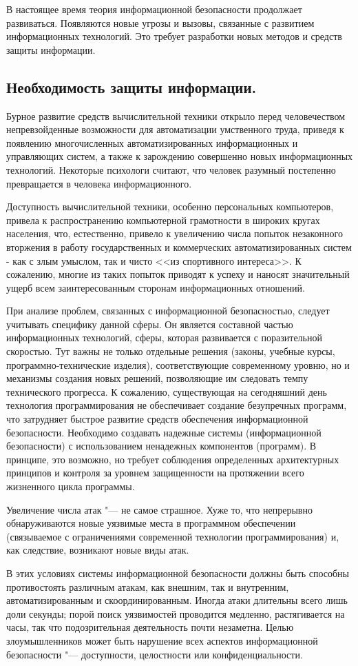 В настоящее время теория информационной безопасности продолжает развиваться. Появляются новые угрозы и вызовы, связанные с 
развитием информационных технологий. Это требует разработки новых методов и средств защиты информации\cite{urfu}.

\newpage
\subsection{Необходимость защиты информации.}
Бурное развитие средств вычислительной техники открыло перед человечеством непревзойденные возможности для автоматизации 
умственного труда, приведя к появлению многочисленных автоматизированных информационных и управляющих систем, а также к 
зарождению совершенно новых информационных технологий. Некоторые психологи считают, что человек разумный постепенно 
превращается в человека информационного.

Доступность вычислительной техники, особенно персональных компьютеров, привела к распространению компьютерной грамотности в 
широких кругах населения, что, естественно, привело к увеличению числа попыток незаконного вторжения в работу государственных 
и коммерческих автоматизированных систем - как с злым умыслом, так и чисто <<из спортивного интереса>>. К сожалению, многие из 
таких попыток приводят к успеху и наносят значительный ущерб всем заинтересованным сторонам информационных отношений.

При анализе проблем, связанных с информационной безопасностью, следует учитывать специфику данной сферы. Он 
является составной частью информационных технологий, сферы, которая развивается с поразительной скоростью. Тут важны не 
только отдельные решения (законы, учебные курсы, программно-технические изделия), соответствующие современному уровню, но и 
механизмы создания новых решений, позволяющие им следовать темпу технического прогресса. К сожалению, существующая на 
сегодняшний день технология программирования не обеспечивает создание безупречных программ, что затрудняет быстрое развитие 
средств обеспечения информационной безопасности. Необходимо создавать надежные системы (информационной безопасности) с 
использованием ненадежных компонентов (программ). В принципе, это возможно, но требует соблюдения определенных архитектурных 
принципов и контроля за уровнем защищенности на протяжении всего жизненного цикла программы.

Увеличение числа атак "--- не самое страшное. Хуже то, что непрерывно обнаруживаются новые уязвимые места в программном 
обеспечении (связываемое с ограничениями современной технологии программирования) и, как следствие, возникают новые виды атак.

В этих условиях системы информационной безопасности должны быть способны противостоять различным атакам, как внешним, так и 
внутренним, автоматизированным и скоординированным. Иногда атаки длительны всего лишь доли секунды; порой поиск уязвимостей 
проводится медленно, растягивается на часы, так что подозрительная деятельность почти незаметна. Целью злоумышленников может 
быть нарушение всех аспектов информационной безопасности "---  доступности, целостности или конфиденциальности\cite{biblio}.
